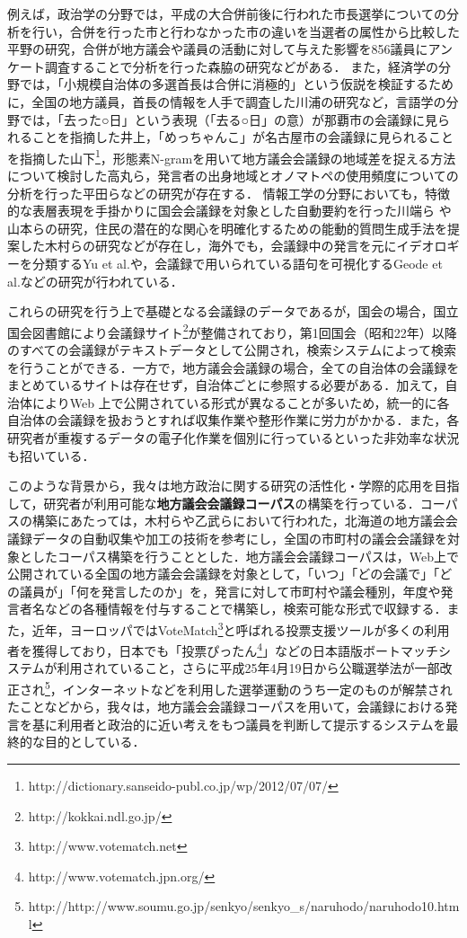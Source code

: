 \documentclass[japanese]{jnlp_1.4}
\begin{document}
例えば，政治学の分野では，平成の大合併前後に行われた市長選挙についての分析を行い，合併を行った市と行わなかった市の違いを当選者の属性から比較した平野\cite{hrn}の研究，合併が地方議会や議員の活動に対して与えた影響を856議員にアンケート調査することで分析を行った森脇\cite{mrwk}の研究などがある．
また，経済学の分野では，「小規模自治体の多選首長は合併に消極的」という仮説を検証するために，全国の地方議員，首長の情報を人手で調査した川浦\cite{kwur,kwur2}の研究など，言語学の分野では，「去った○日」という表現（「去る○日」の意）が那覇市の会議録に見られることを指摘した井上\cite{inue}，「めっちゃんこ」が名古屋市の会議録に見られることを指摘した山下\footnote{http://dictionary.sanseido-publ.co.jp/wp/2012/07/07/}，形態素N-gramを用いて地方議会会議録の地域差を捉える方法について検討した高丸ら\cite{tkmr,tkmr1,tkmr2}，発言者の出身地域とオノマトペの使用頻度についての分析を行った平田ら\cite{hrt}などの研究が存在する．
情報工学の分野においても，特徴的な表層表現を手掛かりに国会会議録を対象とした自動要約を行った川端ら\cite{kwbt} や山本ら\cite{ymmt}の研究，住民の潜在的な関心を明確化するための能動的質問生成手法を提案した木村ら\cite{kim3}の研究などが存在し，海外でも，会議録中の発言を元にイデオロギーを分類するYu et al.\cite{bei}や，会議録で用いられている語句を可視化するGeode et al.\cite{bart}などの研究が行われている．

これらの研究を行う上で基礎となる会議録のデータであるが，国会の場合，国立国会図書館により会議録サイト\footnote{http://kokkai.ndl.go.jp/}が整備されており，第1回国会（昭和22年）以降のすべての会議録がテキストデータとして公開され，検索システムによって検索を行うことができる．一方で，地方議会会議録の場合，全ての自治体の会議録をまとめているサイトは存在せず，自治体ごとに参照する必要がある．加えて，自治体によりWeb 上で公開されている形式が異なることが多いため，統一的に各自治体の会議録を扱おうとすれば収集作業や整形作業に労力がかかる．また，各研究者が重複するデータの電子化作業を個別に行っているといった非効率な状況も招いている．

このような背景から，我々は地方政治に関する研究の活性化・学際的応用を目指して，研究者が利用可能な{\bf 地方議会会議録コーパス}の構築を行っている．コーパスの構築にあたっては，木村ら\cite{kim1}や乙武ら\cite{ottk}において行われた，北海道の地方議会会議録データの自動収集や加工の技術を参考にし，全国の市町村の議会会議録を対象としたコーパス構築を行うこととした．地方議会会議録コーパスは，Web上で公開されている全国の地方議会会議録を対象として，「いつ」「どの会議で」「どの議員が」「何を発言したのか」を，発言に対して市町村や議会種別，年度や発言者名などの各種情報を付与することで構築し，検索可能な形式で収録する．また，近年，ヨーロッパではVoteMatch\footnote{http://www.votematch.net}と呼ばれる投票支援ツールが多くの利用者を獲得しており\cite{uekm,uekm2,kgm}，日本でも「投票ぴったん\footnote{http://www.votematch.jpn.org/}」などの日本語版ボートマッチシステムが利用されていること，さらに平成25年4月19日から公職選挙法が一部改正され\footnote{http://http://www.soumu.go.jp/senkyo/senkyo\_s/naruhodo/naruhodo10.html}，インターネットなどを利用した選挙運動のうち一定のものが解禁されたことなどから，我々は，地方議会会議録コーパスを用いて，会議録における発言を基に利用者と政治的に近い考えをもつ議員を判断して提示するシステムを最終的な目的としている．
\end{document}
